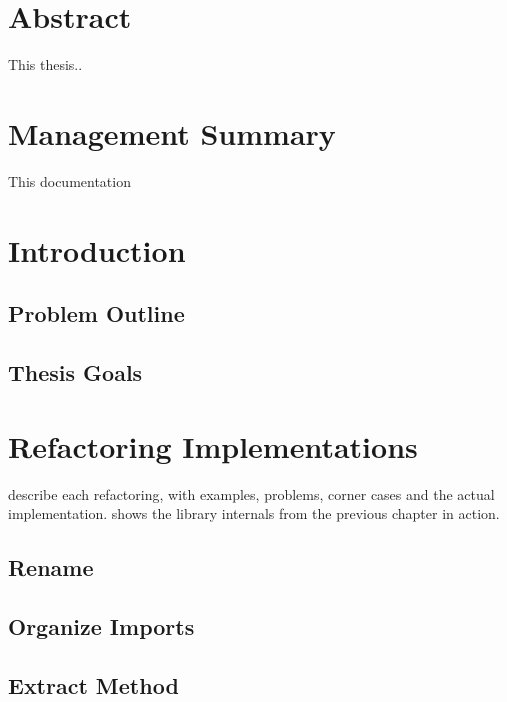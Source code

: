 \documentclass[10pt,a4paper,oneside]{scrreprt}
\begin{document}
\newcommand{\subtitlename}{Master's Thesis}
\newcommand{\titlename}{Refactoring for Scala}



\chapter*{Abstract}


This thesis..


\chapter*{Management Summary}

This documentation 

\newpage

\setcounter{tocdepth}{2}

\tableofcontents

\newpage


\chapter{Introduction}
\section{Problem Outline}
\section{Thesis Goals}



\chapter{Refactoring Implementations}

describe each refactoring, with examples, problems, corner cases and the actual implementation. shows the library internals from the previous chapter in action.

\section{Rename}
\section{Organize Imports}
\section{Extract Method}
\end{document}
